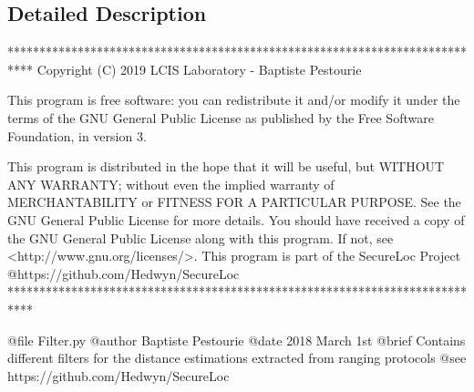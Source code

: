 \subsection{Detailed Description}
\begin{DoxyVerb}****************************************************************************
Copyright (C) 2019 LCIS Laboratory - Baptiste Pestourie

This program is free software: you can redistribute it and/or modify
it under the terms of the GNU General Public License as published by
the Free Software Foundation, in version 3.

This program is distributed in the hope that it will be useful,
but WITHOUT ANY WARRANTY; without even the implied warranty of
MERCHANTABILITY or FITNESS FOR A PARTICULAR PURPOSE. See the
GNU General Public License for more details.
You should have received a copy of the GNU General Public License
along with this program. If not, see <http://www.gnu.org/licenses/>.
This program is part of the SecureLoc Project @https://github.com/Hedwyn/SecureLoc
 ****************************************************************************

@file Filter.py
@author Baptiste Pestourie
@date 2018 March 1st
@brief Contains different filters for the distance estimations extracted from ranging protocols
@see https://github.com/Hedwyn/SecureLoc
\end{DoxyVerb}
 